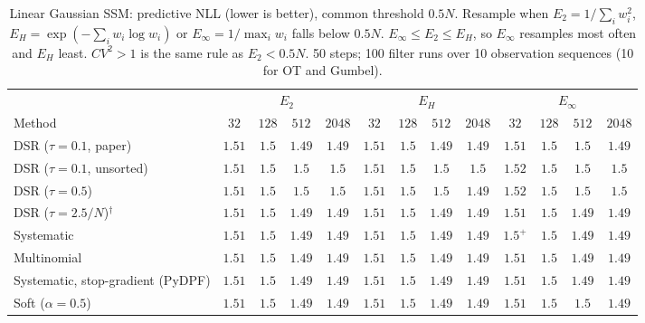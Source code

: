 \begin{table}[ht]
\centering
\small
\caption{Linear Gaussian SSM: predictive NLL (lower is better), common threshold $0.5N$. Resample when $E_2=1/\sum_iw_i^2$, $E_H=\exp(-\sum_iw_i\log w_i)$ or $E_\infty=1/\max_iw_i$ falls below $0.5N$. $E_\infty\le E_2\le E_H$, so $E_\infty$ resamples most often and $E_H$ least. $CV^2>1$ is the same rule as $E_2<0.5N$. 50 steps; 100 filter runs over 10 observation sequences (10 for OT and Gumbel).}
\label{tab:trigger-fixed-linear-predictive_nll}
\begin{adjustbox}{max width=\linewidth}
\begin{tabular}{lcccc|cccc|cccc}
\toprule
 & \multicolumn{4}{c}{$E_2$} & \multicolumn{4}{c}{$E_H$} & \multicolumn{4}{c}{$E_\infty$} \\
\cmidrule(lr){2-5} \cmidrule(lr){6-9} \cmidrule(lr){10-13}
Method & $32$ & $128$ & $512$ & $2048$ & $32$ & $128$ & $512$ & $2048$ & $32$ & $128$ & $512$ & $2048$ \\
\midrule
DSR ($\tau{=}0.1$, paper) & $1.51$ & $\mathbf{1.5}$ & $\mathbf{1.49}$ & $\mathbf{1.49}$ & $\mathbf{1.51}$ & $1.5$ & $1.49$ & $1.49$ & $1.51$ & $1.5$ & $1.5$ & $1.49$ \\
DSR ($\tau{=}0.1$, unsorted) & $\mathbf{1.51}$ & $\mathbf{1.5}$ & $1.5$ & $1.5$ & $1.51$ & $1.5$ & $\mathbf{1.5}$ & $\mathbf{1.5}$ & $1.52$ & $1.5$ & $1.5$ & $1.5$ \\
DSR ($\tau{=}0.5$) & $\mathbf{1.51}$ & $\mathbf{1.5}$ & $1.5$ & $1.5$ & $1.51$ & $1.5$ & $\mathbf{1.5}$ & $\mathbf{1.49}$ & $1.52$ & $1.5$ & $1.5$ & $1.5$ \\
DSR ($\tau{=}2.5/N$)$^\dagger$ & $1.51$ & $\mathbf{1.5}$ & $1.49$ & $1.49$ & $1.51$ & $1.5$ & $1.49$ & $1.49$ & $\mathbf{1.51}$ & $1.5$ & $\mathbf{1.49}$ & $\mathbf{1.49}$ \\
\midrule
Systematic & $1.51$ & $1.5$ & $1.49$ & $\mathbf{1.49}$ & $1.51$ & $1.5$ & $\mathbf{1.49}$ & $1.49$ & $\mathbf{1.5}^{+}$ & $\mathbf{1.5}$ & $1.49$ & $1.49$ \\
Multinomial & $1.51$ & $1.5$ & $1.49$ & $\mathbf{1.49}$ & $1.51$ & $1.5$ & $\mathbf{1.49}$ & $1.49$ & $\mathbf{1.51}$ & $\mathbf{1.5}$ & $1.49$ & $1.49$ \\
Systematic, stop-gradient (PyDPF) & $1.51$ & $1.5$ & $\mathbf{1.49}$ & $1.49$ & $1.51$ & $1.5$ & $1.49$ & $1.49$ & $\mathbf{1.51}$ & $\mathbf{1.5}$ & $1.49$ & $\mathbf{1.49}$ \\
Soft ($\alpha{=}0.5$) & $1.51$ & $1.5$ & $\mathbf{1.49}$ & $\mathbf{1.49}$ & $1.51$ & $1.5$ & $1.49$ & $1.49$ & $\mathbf{1.51}$ & $\mathbf{1.5}$ & $1.5$ & $1.49$ \\

\end{tabular}
\end{adjustbox}
\end{table}
